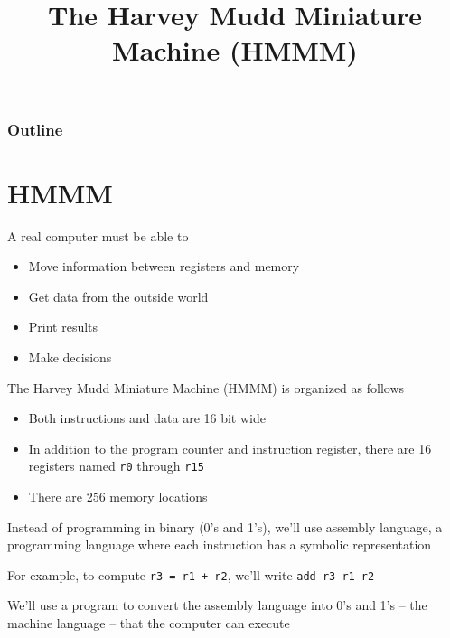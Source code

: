\documentclass[8pt,a4paper,compress]{beamer}
\title{The Harvey Mudd Miniature Machine (HMMM)}
\date{}
\begin{document}
\begin{frame}
\vfill
\titlepage
\end{frame}

\begin{frame}
\frametitle{Outline}
\tableofcontents
\end{frame}

\section{HMMM}
\begin{frame}[fragile]
\pause

A real computer must be able to
\begin{itemize}
\item Move information between registers and memory
\item Get data from the outside world
\item Print results
\item Make decisions
\end{itemize}

\pause
\bigskip

The Harvey Mudd Miniature Machine (HMMM) is organized as follows
\begin{itemize}
\item Both instructions and data are 16 bit wide
\item In addition to the program counter and instruction register, there are 16 registers named \lstinline{r0} through \lstinline{r15}
\item There are 256 memory locations
\end{itemize}

\pause
\bigskip

Instead of programming in binary (0's and 1's), we'll use assembly language, a programming language where each instruction has a symbolic representation

\pause
\bigskip

For example, to compute \lstinline{r3 = r1 + r2}, we'll write \lstinline{add r3 r1 r2}

\pause
\bigskip

We'll use a program to convert the assembly language into 0's and 1's -- the machine language -- that the computer can execute
\end{frame}
\end{document}
